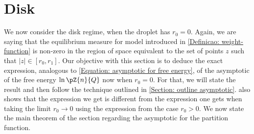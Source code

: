 \section{Disk}
\label{Subsection: Disk}

We now  consider the disk regime, when the droplet has $r_0 = 0$. Again, we are saying that the equilibrium measure for model introduced in \autoref{Definicao: weight-function} is non-zero in the region of space equivalent to the set of points $z$ such that $|z| \in [r_0, r_1]$. Our objective with this section is to deduce the exact expression, analogous to \eqref{Equation: asymptotic for free energy}, of the asymptotic of the free energy $\ln{\pZ{n}{Q}}$ now when $r_0 = 0$. For that, we will state the result and then follow the technique outlined in \autoref{Section: outline asymptotic}.  also shows that the expression we get is different from the expression one gets when taking the limit $r_0 \rightarrow 0$ using the expression from the case $r_0 > 0$. We now state the main theorem of the section regarding the asymptotic for the partition function. 

